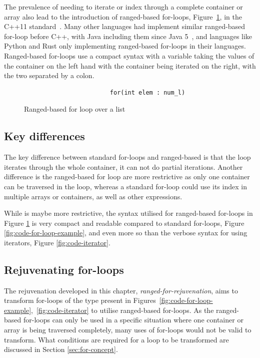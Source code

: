 \documentclass[bsc,frontabs,singlespacing,twoside,parskip,deptreport]{infthesis}
\begin{document}
The prevalence of needing to iterate or index through a complete container or array also lead to the introduction of ranged-based for-loops, Figure~\ref{fig:code-ranged-based-for}, in the C++11 standard~\cite{RANGED_FOR_CPP}. Many other languages had implement similar ranged-based for-loop before C++, with Java including them since Java 5~\cite{JAVA_RANGE}, and languages like Python and Rust only implementing ranged-based for-loops in their languages. Ranged-based for-loops use a compact syntax with a variable taking the values of the container on the left hand with the container being iterated on the right, with the two separated by a colon. 

\begin{figure}[H]
    \begin{verbatim}
                        for(int elem : num_l)
    \end{verbatim}
    \caption{Ranged-based for loop over a list}
    \centering
    \label{fig:code-ranged-based-for}
\end{figure}

\subsection{Key differences}

The key difference between standard for-loops and ranged-based is that the loop iterates through the whole container, it can not do partial iterations. Another difference is the ranged-based for loop are more restrictive as only one container can be traversed in the loop, whereas a standard for-loop could use its index in multiple arrays or containers, as well as other expressions. 

While is maybe more restrictive, the syntax utilised for ranged-based for-loops in Figure \ref{fig:code-ranged-based-for} is very compact and readable compared to standard for-loops, Figure \ref{fig:code-for-loop-example}, and even more so than the verbose syntax for using iterators, Figure \ref{fig:code-iterator}.

\subsection{Rejuvenating for-loops}

The rejuvenation developed in this chapter, \textit{ranged-for-rejuvenation}, aims to transform for-loops of the type present in Figures~\ref{fig:code-for-loop-example},~\ref{fig:code-iterator} to utilise ranged-based for-loops. As the ranged-based for-loops can only be used in a specific situation where one container or array is being traversed completely, many uses of for-loops would not be valid to transform. What conditions are required for a loop to be transformed are discussed in Section \ref{sec:for-concept}. 
\end{document}

